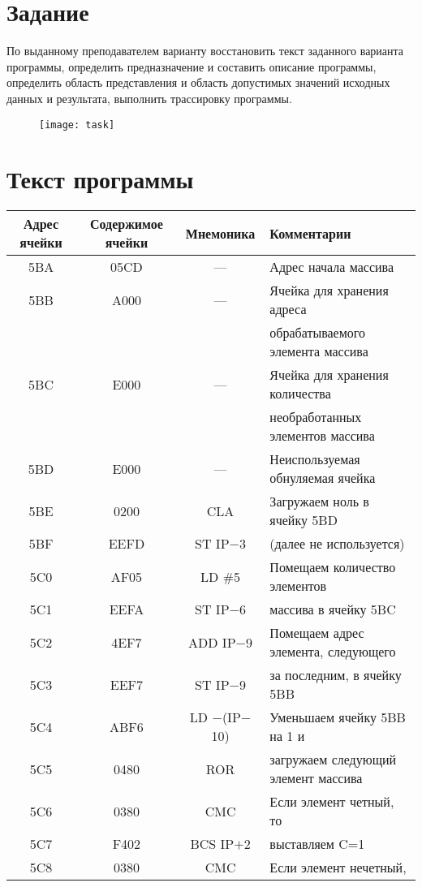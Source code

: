 \section{Задание}
По выданному преподавателем варианту восстановить текст заданного варианта программы, определить предназначение и составить описание программы, определить область представления и область допустимых значений исходных данных и результата, выполнить трассировку программы.
\begin{figure}[H]
\centering
\texttt{[image: task]}
\label{pic:task}
\end{figure}

\section{Текст программы}
\begin{center}
\begin{tabular}{|c|c|c|l|}
\hline
\textbf{Адрес ячейки} & \textbf{Содержимое ячейки} & \textbf{Мнемоника} & \textbf{Комментарии}\\
\hline
5BA & 05CD & --- & Адрес начала массива\\
5BB & A000 & --- & Ячейка для хранения адреса\\
		   & & & обрабатываемого элемента массива\\
5BC & E000 & --- & Ячейка для хранения количества\\
		   & & & необработанных элементов массива\\
5BD & E000 & --- & Неиспользуемая обнуляемая ячейка\\
\hline
5BE & 0200 & CLA & Загружаем ноль в ячейку 5BD\\
5BF & EEFD & ST IP$-$3 & (далее не используется)\\
5C0 & AF05 & LD \#5 & Помещаем количество элементов\\
5C1 & EEFA & ST IP$-$6 & массива в ячейку 5BC\\
5C2 & 4EF7 & ADD IP$-$9 & Помещаем адрес элемента, следующего\\
5C3 & EEF7 & ST IP$-$9 & за последним, в ячейку 5BB\\
5C4 & ABF6 & LD $-$(IP$-$10) & Уменьшаем ячейку 5BB на 1 и\\
5C5 & 0480 & ROR & загружаем следующий элемент массива\\
5C6 & 0380 & CMC & Если элемент четный, то\\
5C7 & F402 & BCS IP$+$2 & выставляем C=1\\
5C8 & 0380 & CMC & Если элемент нечетный,\\

\end{tabular}
\end{center}
